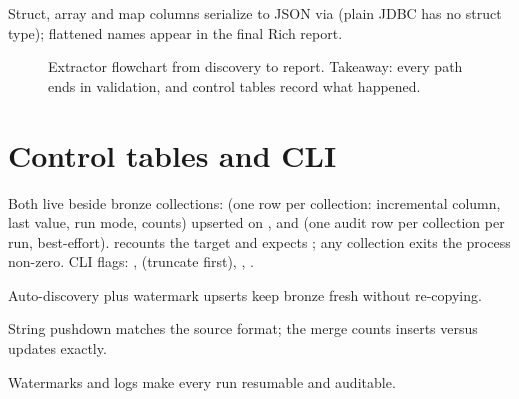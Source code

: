 Struct, array and map columns serialize to JSON via  (plain JDBC has no struct type); flattened names appear in the final Rich report.

\begin{figure}[tbp]
\centering

\caption{Extractor flowchart from discovery to report. Takeaway: every path ends in validation, and control tables record what happened.}
\label{fig:extract-flow}
\end{figure}

\section{Control tables and CLI}

Both live beside bronze collections:  (one row per collection: incremental column, last value, run mode, counts) upserted on , and  (one audit row per collection per run, best-effort).  recounts the target and expects ; any  collection exits the process non-zero. CLI flags: ,  (truncate first), , .

\begin{keybox}
\item Auto-discovery plus watermark upserts keep bronze fresh without re-copying.
\item String pushdown matches the source format; the merge counts inserts versus updates exactly.
\item Watermarks and logs make every run resumable and auditable.
\end{keybox}
